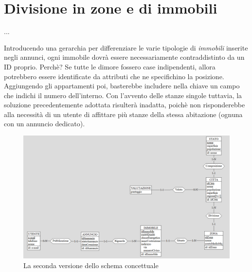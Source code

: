 \documentclass[a4paper,12pt]{report}
\begin{document}
        \section{Divisione in zone e di immobili}
        
        ...

        Introducendo una gerarchia per differenziare le varie tipologie di \textit{immobili} inserite negli annunci,
        ogni immobile dovrà essere necessariamente contraddistinto da un ID proprio. Perchè? Se tutte le dimore
        fossero case indipendenti, allora potrebbero essere identificate da attributi che ne specifichino la posizione.
        Aggiungendo gli appartamenti poi, basterebbe includere nella chiave un campo che indichi il numero dell'interno.
        Con l'avvento delle stanze singole tuttavia, la soluzione precedentemente adottata risulterà inadatta, poichè 
        non risponderebbe alla necessità di un utente di affittare più stanze della stessa abitazione (ognuna con un 
        annuncio dedicato).

        \begin{figure}[ht]
            \centering{}
            \includegraphics[width=\linewidth]{./images/second.png}
            \caption{La seconda versione dello schema concettuale}
        \end{figure}
\end{document}
